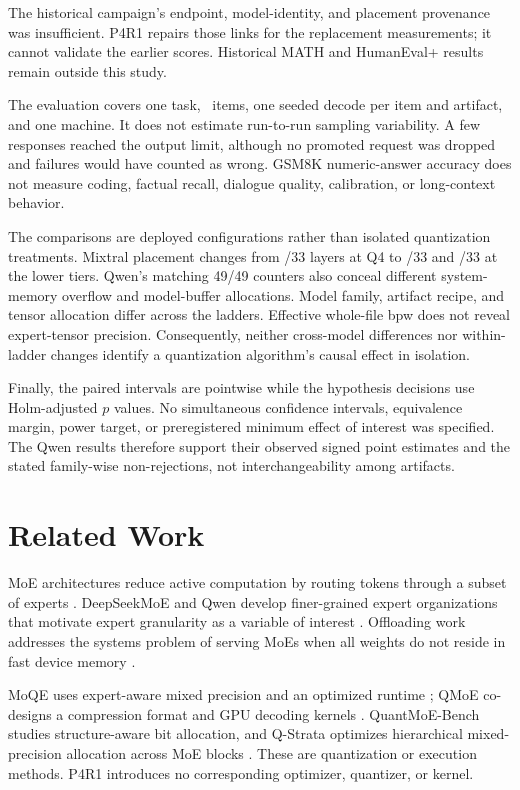 \documentclass[11pt]{article}
\begin{document}
The historical campaign's endpoint, model-identity, and placement provenance
was insufficient. P4R1 repairs those links for the replacement measurements;
it cannot validate the earlier scores. Historical MATH and HumanEval+ results
remain outside this study.

The evaluation covers one task, \PfourPrimaryItemCount\ items, one seeded
decode per item and artifact, and one machine. It does not estimate
run-to-run sampling variability. A few responses reached the output limit,
although no promoted request was dropped and failures would have counted as
wrong. GSM8K numeric-answer accuracy does not measure coding, factual recall,
dialogue quality, calibration, or long-context behavior.

The comparisons are deployed configurations rather than isolated
quantization treatments. Mixtral placement changes from
\PfourMixtralHealthyGpuLayers/33 layers at Q4 to
\PfourMixtralIqTwoGpuLayers/33 and \PfourMixtralIqOneGpuLayers/33 at the
lower tiers. Qwen's matching 49/49 counters also conceal different
system-memory overflow and model-buffer allocations. Model family, artifact
recipe, and tensor allocation differ across the ladders. Effective whole-file bpw
does not reveal expert-tensor precision. Consequently, neither cross-model
differences nor within-ladder changes identify a quantization algorithm's
causal effect in isolation.

Finally, the paired intervals are pointwise while the hypothesis decisions
use Holm-adjusted $p$ values. No simultaneous confidence intervals,
equivalence margin, power target, or preregistered minimum effect of interest
was specified. The Qwen results therefore support their observed signed point
estimates and the stated family-wise non-rejections, not interchangeability
among artifacts.

\section{Related Work}

MoE architectures reduce active computation by routing tokens through a
subset of experts \citep{fedus2021switch,jiang2024mixtral}. DeepSeekMoE and
Qwen develop finer-grained expert organizations that motivate expert
granularity as a variable of interest
\citep{dai2024deepseekmoe,qwen2025qwen3}. Offloading work addresses the
systems problem of serving MoEs when all weights do not reside in fast device
memory \citep{eliseev2023offloading}.

MoQE uses expert-aware mixed precision and an optimized runtime
\citep{kim2023moqe}; QMoE co-designs a compression format and GPU decoding
kernels \citep{frantar2023qmoe}. QuantMoE-Bench studies structure-aware bit
allocation, and Q-Strata optimizes hierarchical mixed-precision allocation
across MoE blocks \citep{li2024quantmoebench,lee2026qstrata}. These are
quantization or execution methods. P4R1 introduces no corresponding optimizer,
quantizer, or kernel.
\end{document}
